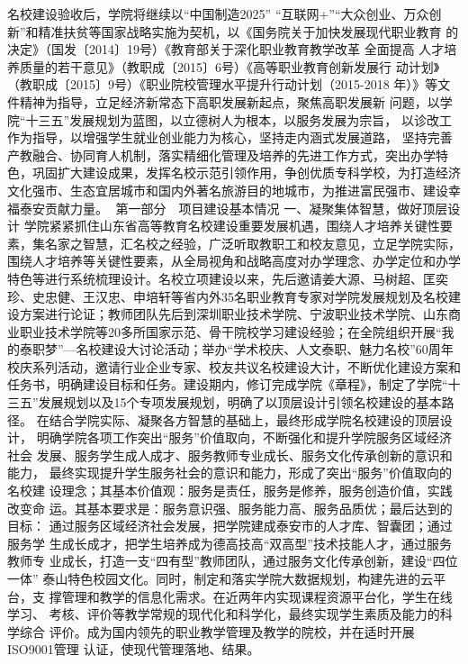 名校建设验收后，学院将继续以“中国制造2025” “互联网+”“大众创业、万众创
新”和精准扶贫等国家战略实施为契机，以《国务院关于加快发展现代职业教育
的决定》（国发〔2014〕19号）《教育部关于深化职业教育教学改革 全面提高
人才培养质量的若干意见》（教职成〔2015〕6号）《高等职业教育创新发展行
动计划》（教职成〔2015〕9号）《职业院校管理水平提升行动计划（2015-2018
年）》等文件精神为指导，立足经济新常态下高职发展新起点，聚焦高职发展新
问题，以学院“十三五”发展规划为蓝图，以立德树人为根本，以服务发展为宗旨，
以诊改工作为指导，以增强学生就业创业能力为核心，坚持走内涵式发展道路，
坚持完善产教融合、协同育人机制，落实精细化管理及培养的先进工作方式，突出办学特色，巩固扩大建设成果，发挥名校示范引领作用，争创优质专科学校，为打造经济文化强市、生态宜居城市和国内外著名旅游目的地城市，为推进富民强市、建设幸福泰安贡献力量。
第一部分　项目建设基本情况
一、凝聚集体智慧，做好顶层设计
学院紧紧抓住山东省高等教育名校建设重要发展机遇，围绕人才培养关键性要素，集名家之智慧，汇名校之经验，广泛听取教职工和校友意见，立足学院实际，围绕人才培养等关键性要素，从全局视角和战略高度对办学理念、办学定位和办学特色等进行系统梳理设计。名校立项建设以来，先后邀请姜大源、马树超、匡奕珍、史忠健、王汉忠、申培轩等省内外35名职业教育专家对学院发展规划及名校建设方案进行论证；教师团队先后到深圳职业技术学院、宁波职业技术学院、山东商业职业技术学院等20多所国家示范、骨干院校学习建设经验；在全院组织开展“我的泰职梦”—名校建设大讨论活动；举办“学术校庆、人文泰职、魅力名校”60周年校庆系列活动，邀请行业企业专家、校友共议名校建设大计，不断优化建设方案和任务书，明确建设目标和任务。建设期内，修订完成学院《章程》，制定了学院“十三五”发展规划以及15个专项发展规划，明确了以顶层设计引领名校建设的基本路径。
在结合学院实际、凝聚各方智慧的基础上，最终形成学院名校建设的顶层设计，
明确学院各项工作突出“服务”价值取向，不断强化和提升学院服务区域经济社会
发展、服务学生成人成才、服务教师专业成长、服务文化传承创新的意识和能力，
最终实现提升学生服务社会的意识和能力，形成了突出“服务”价值取向的名校建
设理念；其基本价值观：服务是责任，服务是修养，服务创造价值，实践改变命
运。其基本要求是：服务意识强、服务能力高、服务品质优；最后达到的目标：
通过服务区域经济社会发展，把学院建成泰安市的人才库、智囊团；通过服务学
生成长成才，把学生培养成为德高技高“双高型”技术技能人才，通过服务教师专
业成长，打造一支“四有型”教师团队，通过服务文化传承创新，建设“四位一体”
泰山特色校园文化。同时，制定和落实学院大数据规划，构建先进的云平台，支
撑管理和教学的信息化需求。在近两年内实现课程资源平台化，学生在线学习、
考核、评价等教学常规的现代化和科学化，最终实现学生素质及能力的科学综合
评价。成为国内领先的职业教学管理及教学的院校，并在适时开展ISO9001管理
认证，使现代管理落地、结果。
